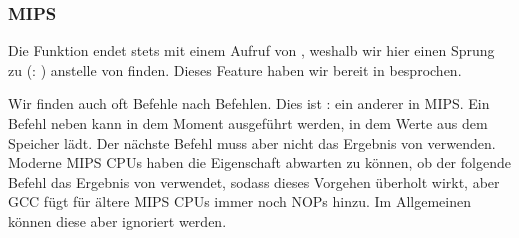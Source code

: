 \subsubsection{MIPS}



Die Funktion endet stets mit einem Aufruf von \puts, weshalb wir hier einen Sprung zu \puts (: ) anstelle von  finden.
Dieses Feature haben wir bereit in  besprochen.

Wir finden auch oft  Befehle nach  Befehlen.
Dies ist : ein anderer  in MIPS.
Ein Befehl neben  kann in dem Moment ausgeführt werden, in dem  Werte aus dem Speicher lädt.
Der nächste Befehl muss aber nicht das Ergebnis von  verwenden.
Moderne MIPS CPUs haben die Eigenschaft abwarten zu können, ob der folgende Befehl das Ergebnis von  verwendet,
sodass dieses Vorgehen überholt wirkt, aber GCC fügt für ältere MIPS CPUs immer noch NOPs hinzu.
Im Allgemeinen können diese aber ignoriert werden.